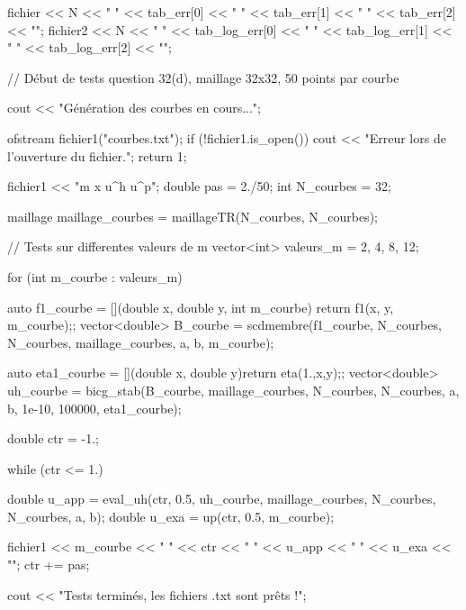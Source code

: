 \begin{codeblock}
{{        fichier << N << " " << tab_err[0] << " " << tab_err[1] << " " << tab_err[2] << "\n";
        fichier2 << N << " " << tab_log_err[0] << " " << tab_log_err[1] << " " << tab_log_err[2] << "\n";
    }

    // Début de tests question 32(d), maillage 32x32, 50 points par courbe

    cout << "Génération des courbes en cours...\n";

    ofstream fichier1("courbes.txt");
    if (!fichier1.is_open()) {
        cout << "Erreur lors de l'ouverture du fichier.\n";
        return 1;
    }

    fichier1 << "m x u^h u^p\n";
    double pas = 2./50;
    int N_courbes = 32;

    maillage maillage_courbes = maillageTR(N_courbes, N_courbes);

    // Tests sur differentes valeurs de m
    vector<int> valeurs_m = {2, 4, 8, 12};

    for (int m_courbe : valeurs_m){
        auto f1_courbe = [](double x, double y, int m_courbe){ return f1(x, y, m_courbe);};
        vector<double> B_courbe = scdmembre(f1_courbe, N_courbes, N_courbes, maillage_courbes, a, b, m_courbe);

        auto eta1_courbe = [](double x, double y){return eta(1.,x,y);};
        vector<double> uh_courbe = bicg_stab(B_courbe, maillage_courbes, N_courbes, N_courbes, a, b, 1e-10, 100000, eta1_courbe);

        double ctr = -1.;

        while (ctr <= 1.){
            double u_app = eval_uh(ctr, 0.5, uh_courbe, maillage_courbes, N_courbes, N_courbes, a, b);
            double u_exa = up(ctr, 0.5, m_courbe);

            fichier1 << m_courbe << " " << ctr << " " << u_app << " " << u_exa << "\n";
            ctr += pas;
        }

    }

    cout << "Tests terminés, les fichiers .txt sont prêts !\n";

}
\end{codeblock}